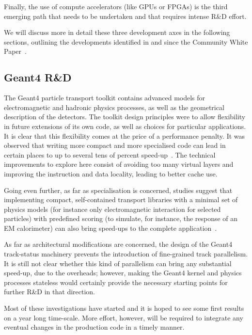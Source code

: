 Finally, the use of compute
accelerators (like GPUs or FPGAs) is the third emerging path that needs
to be undertaken and that requires intense R\&D effort.


We will discuss
more in detail these three development axes in the following sections, 
outlining the developments identified in and since the
Community White Paper~\cite{Albrecht2019, SimFoundation2018hep}. 

\hypertarget{geant4-rd}{%
\subsection{Geant4 R\&D}\label{geant4-rd}}

The Geant4 particle transport toolkit contains advanced models for
electromagnetic and hadronic physics processes, as well as the
geometrical description of the detectors. The toolkit design principles
were to allow flexibility in future extensions of its own code, as well
as choices for particular applications. It is clear that this
flexibility comes at the price of a performance penalty. It was observed that
writing more compact and more specialised code can lead in certain
places to up to several tens of percent speed-up~\cite{GeantV}. The
technical improvements to explore here consist of avoiding too many
virtual layers and improving the instruction and data locality, leading
to better cache use.

Going even further, as far as specialisation is
concerned, studies suggest that implementing compact, self-contained
transport libraries with a minimal set of physics models (for instance
only electromagnetic interaction for selected particles) with predefined
scoring (to simulate, for instance, the response of an EM calorimeter)
can also bring speed-ups to the complete application~\cite{GeantV}.

As
far as architectural modifications are concerned, the design of the
Geant4 track-status machinery prevents the introduction of fine-grained
track parallelism. It is still not clear whether this kind of
parallelism can bring any substantial speed-up, due to the overheads;
however, making the Geant4 kernel and physics processes stateless would
certainly provide the necessary starting points for further R\&D in that
direction.

Most of these investigations have started and it is hoped to
see some first results on a year long time-scale. More effort, however, will
be required to integrate any eventual changes in the production code in
a timely manner.

